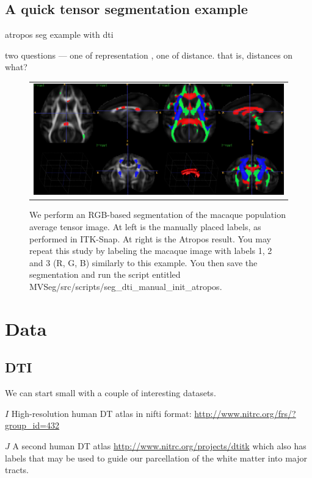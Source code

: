 \documentclass[11pt,english]{article}
\begin{document}
\subsection{A quick tensor segmentation example}
atropos seg example with dti

two questions --- one of representation , one of distance.  that is,
distances on what?
\begin{figure}
\begin{center}
\begin{tabular}{c}
\includegraphics[width=6in]{Figures/macaque_rgb.pdf}
\end{tabular}
\caption{We perform an RGB-based segmentation of the macaque
  population average tensor image.  At left is the manually placed
  labels, as performed in ITK-Snap.  At right is the Atropos result.
  You may repeat this study by labeling the macaque image with labels
  1, 2 and 3 (R, G, B) similarly to this example.  You then
  save the segmentation and run the script entitled MVSeg/src/scripts/seg\_dti\_manual\_init\_atropos.}
\label{fig:example1}
\end{center}
\end{figure}



\section{Data}
\subsection{DTI}
We can start small with a couple of interesting datasets. 

\noindent $I$ High-resolution human DT atlas in nifti format: \url{http://www.nitrc.org/frs/?group_id=432}

\noindent $J$ A second human DT atlas
\url{http://www.nitrc.org/projects/dtitk} which also has labels that
may be used to guide our parcellation of the white matter into major
tracts.
\end{document}
